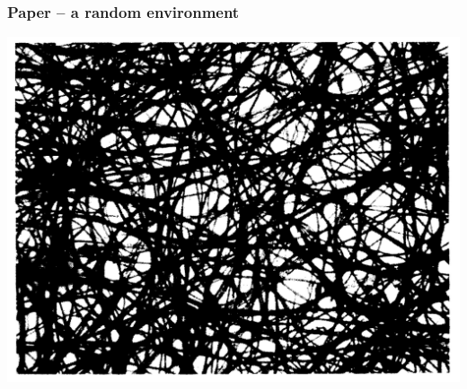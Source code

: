 \documentclass[9pt,table,xcolor=dvipsnames]{beamer}
\begin{document}
\begin{frame}[fragile] %
  \frametitle{Paper -- a random environment}

  \begin{center}
    \includegraphics[scale=0.20]{./figs/Paper_Random_Environment.png}
  \end{center}

\end{frame}
\end{document}

